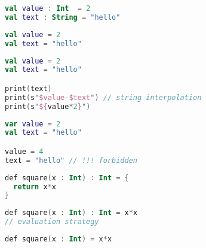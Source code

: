 \documentclass[10pt]{beamer}
\begin{document}
\begin{frame}[fragile]
\begin{lstlisting}[language=Kotlin, basicstyle=\ttfamily]
val value : Int  = 2
val text : String = "hello" 
\end{lstlisting}
\end{frame}

\begin{frame}[fragile]
\begin{lstlisting}[language=Kotlin, basicstyle=\ttfamily]
val value = 2
val text = "hello" 
\end{lstlisting}
\end{frame}

\begin{frame}[fragile]
\begin{lstlisting}[language=Kotlin, basicstyle=\ttfamily]
val value = 2
val text = "hello"

print(text)
print(s"$value-$text") // string interpolation 
print(s"${value*2}")
\end{lstlisting}
\end{frame}

\begin{frame}[fragile]
\begin{lstlisting}[language=Kotlin, basicstyle=\ttfamily]
var value = 2
val text = "hello" 

value = 4
text = "hello" // !!! forbidden 
\end{lstlisting}
\end{frame}

\begin{frame}[fragile]
\begin{lstlisting}[language=Kotlin, basicstyle=\ttfamily]
def square(x : Int) : Int = {
  return x*x
}
\end{lstlisting}
\end{frame}

\begin{frame}[fragile]
\begin{lstlisting}[language=Kotlin, basicstyle=\ttfamily]
def square(x : Int) : Int = x*x 
// evaluation strategy 
\end{lstlisting}
\end{frame}

\begin{frame}[fragile]
\begin{lstlisting}[language=Kotlin, basicstyle=\ttfamily]
def square(x : Int) = x*x
\end{lstlisting}
\end{frame}
\end{document}
